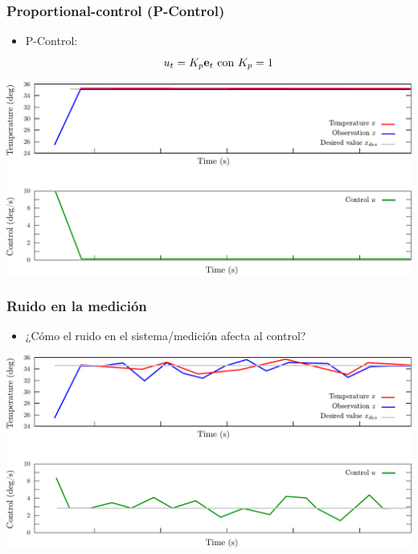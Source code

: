 \begin{frame}
    \frametitle{Proportional-control (P-Control)}
    
    \begin{itemize}
        \item P-Control:
        \begin{equation*}
            u_{t} = K_{p} \boldsymbol{\mathbf{e}}_{t} \text{ con } K_{p} = 1
        \end{equation*}
    \end{itemize}
    
    \begin{center}
        \includegraphics[width=0.8\columnwidth]{images/pid_control_proportional.pdf}
    \end{center}
    
\end{frame}


\begin{frame}
    \frametitle{Ruido en la medición}
    
    \begin{itemize}
        \item ¿Cómo el ruido en el sistema/medición afecta al control?
    \end{itemize}
    
    \begin{center}
        \includegraphics[width=0.8\columnwidth]{images/pid_control_proportional_noise_effect.pdf}
    \end{center}
    
\end{frame}


